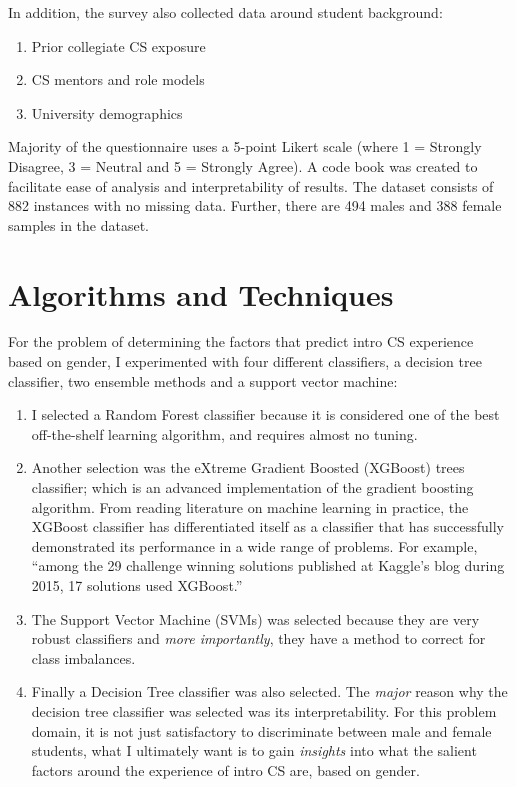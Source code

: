 In addition, the survey also collected data around student background: 

\begin{enumerate}%
\item Prior collegiate CS exposure
\item CS mentors and role models
\item University demographics
\end{enumerate}



Majority of the questionnaire uses a 5-point Likert scale (where 1 = Strongly Disagree, 3 = Neutral and 5 = Strongly Agree). A code book was created to facilitate ease of analysis and interpretability of results. The dataset consists of 882 instances with no missing data. Further, there are 494 males and 388 female samples in the dataset. 


\section*{Algorithms and Techniques}

For the problem of determining the factors that predict intro CS experience based on gender, I experimented with four different classifiers, a decision tree classifier, two ensemble methods and a support vector machine:

\begin{enumerate}%
\item I selected a Random Forest classifier because it is considered one of the best off-the-shelf learning algorithm, and requires almost no tuning. 

\item Another selection was the eXtreme Gradient Boosted (XGBoost) trees classifier; which is an advanced implementation of the gradient boosting algorithm. From reading literature on machine learning in practice, the XGBoost classifier has differentiated itself as a classifier that has successfully demonstrated its performance in a wide range of problems. For example, ``among the 29 challenge winning solutions published at Kaggle's blog during 2015, 17 solutions used XGBoost.''

\item The Support Vector Machine (SVMs) was selected because they are very robust classifiers and \textit{more importantly}, they have a method to correct for class imbalances. 
              
\item Finally a Decision Tree classifier was also selected. The \textit{major} reason why the decision tree classifier was selected was its interpretability. For this problem domain, it is not just satisfactory to discriminate between male and female students, what I ultimately want is to gain \textit{insights} into what the salient factors around the experience of intro CS are, based on gender.

\end{enumerate}

